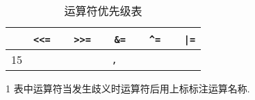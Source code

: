 \begin{table}[htbp]
\begin{threeparttable}
\begin{tabular}{|c|c|}
                        & \texttt{<<=} \ \ \ \texttt{>>=} \ \ \ \texttt{\&=} \ \ \ \texttt{\^{}=} \ \ \ \texttt{|=} \\
                \hline
                15      & \texttt{,} \\
                \hline
            \end{tabular}
            \begin{tablenotes}
                \item[1] 表中运算符当发生歧义时运算符后用上标标注运算名称.
            \end{tablenotes}
            \caption{运算符优先级表} \label{运算符优先级表} 
        \end{threeparttable}
    \end{table}